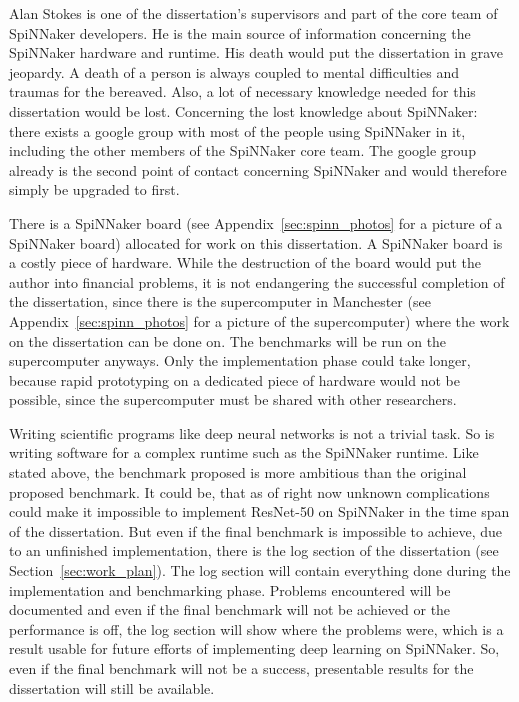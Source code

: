 \documentclass{article}
\begin{document}
Alan Stokes is one of the dissertation's supervisors and part
of the core team of SpiNNaker developers.
He is the main source of information concerning the
SpiNNaker hardware and runtime.
His death would put the dissertation in grave jeopardy.
A death of a person is always coupled to mental
difficulties and traumas for the bereaved.
Also, a lot of necessary knowledge needed for this
dissertation would be lost.
Concerning the lost knowledge about SpiNNaker: there exists a google
group with most of the people using SpiNNaker in it, including the
other members of the SpiNNaker core team.
The google group already is the second point of contact
concerning SpiNNaker and would therefore simply be upgraded to
first.

There is a SpiNNaker board (see
Appendix~\ref{sec:spinn_photos} for a picture of a
SpiNNaker board) allocated for work on this dissertation.
A SpiNNaker board is a costly piece of hardware.
While the destruction of the board would put the author
into financial problems, it is not endangering the
successful completion of the dissertation, since there is
the supercomputer in Manchester (see
Appendix~\ref{sec:spinn_photos} for a picture of the
supercomputer) where the work on the dissertation can be
done on.
The benchmarks will be run on the supercomputer anyways.
Only the implementation phase could take longer, because
rapid prototyping on a dedicated piece of hardware would
not be possible, since the supercomputer must be shared
with other researchers.

Writing scientific programs like deep neural networks is
not a trivial task.
So is writing software for a complex runtime such as the
SpiNNaker runtime.
Like stated above, the benchmark proposed is more ambitious
than the original proposed benchmark.
It could be, that as of right now unknown complications
could make it impossible to implement ResNet-50 on
SpiNNaker in the time span of the dissertation.
But even if the final benchmark is impossible to achieve,
due to an unfinished implementation, there is the log
section of the dissertation (see
Section~\ref{sec:work_plan}).
The log section will contain everything done during the
implementation and benchmarking phase.
Problems encountered will be documented and even if the
final benchmark will not be achieved or the performance is
off, the log section will show where the problems were,
which is a result usable for future efforts of implementing
deep learning on SpiNNaker.
So, even if the final benchmark will not be a success,
presentable results for the dissertation will still be
available.
\end{document}
